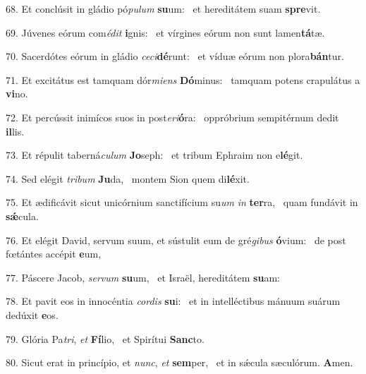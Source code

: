 68. Et conclúsit in gládio pó\textit{pu}\textit{lum} \textbf{su}um: \ast\  et hereditátem suam \textbf{spre}vit.\

69. Júvenes eórum com\textit{é}\textit{dit} \textbf{i}gnis: \ast\  et vírgines eórum non sunt lamen\textbf{tá}tæ.\

70. Sacerdótes eórum in gládio \textit{ce}\textit{ci}\textbf{dé}runt: \ast\  et víduæ eórum non plora\textbf{bán}tur.\

71. Et excitátus est tamquam dór\textit{mi}\textit{ens} \textbf{Dó}minus: \ast\  tamquam potens crapulátus a \textbf{vi}no.\

72. Et percússit inimícos suos in post\textit{e}\textit{ri}\textbf{ó}ra: \ast\  oppróbrium sempitérnum dedit \textbf{il}lis.\

73. Et répulit taberná\textit{cu}\textit{lum} \textbf{Jo}seph: \ast\  et tribum Ephraim non e\textbf{lé}git.\

74. Sed elégit \textit{tri}\textit{bum} \textbf{Ju}da, \ast\  montem Sion quem di\textbf{lé}xit.\

75. Et ædificávit sicut unicórnium sanctifícium su\textit{um} \textit{in} \textbf{ter}ra, \ast\  quam fundávit in \textbf{sǽ}cula.\

76. Et elégit David, servum suum, et sústulit eum de gré\textit{gi}\textit{bus} \textbf{ó}vium: \ast\  de post fœtántes accépit \textbf{e}um,\

77. Páscere Jacob, \textit{ser}\textit{vum} \textbf{su}um, \ast\  et Israël, hereditátem \textbf{su}am:\

78. Et pavit eos in innocéntia \textit{cor}\textit{dis} \textbf{su}i: \ast\  et in intelléctibus mánuum suárum dedúxit \textbf{e}os.\

79. Glória Pa\textit{tri}, \textit{et} \textbf{Fí}lio, \ast\  et Spirítui \textbf{Sanc}to.\

80. Sicut erat in princípio, et \textit{nunc}, \textit{et} \textbf{sem}per, \ast\  et in sǽcula sæculórum. \textbf{A}men.\

